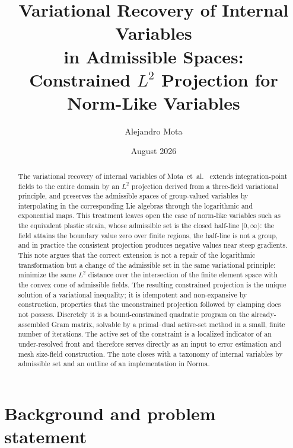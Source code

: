 \documentclass[11pt]{article}
\title{Variational Recovery of Internal Variables\\
in Admissible Spaces:\\
Constrained $L^2$ Projection for Norm-Like Variables}
\author{Alejandro Mota}
\date{August 2026}
\begin{document}
\maketitle

\begin{abstract}
The variational recovery of internal variables of
Mota~et~al.~\cite{mota2013} extends integration-point fields to the entire
domain by an $L^2$ projection derived from a three-field variational
principle, and preserves the admissible spaces of group-valued variables by
interpolating in the corresponding Lie algebras through the logarithmic and
exponential maps. This treatment leaves open the case of norm-like
variables such as the equivalent plastic strain, whose admissible set is
the closed half-line $[0,\infty)$: the field attains the boundary value
zero over finite regions, the half-line is not a group, and in practice the
consistent projection produces negative values near steep gradients. This
note argues that the correct extension is not a repair of the logarithmic
transformation but a change of the admissible set in the same variational
principle: minimize the same $L^2$ distance over the intersection of the
finite element space with the convex cone of admissible fields. The
resulting constrained projection is the unique solution of a variational
inequality; it is idempotent and non-expansive by construction, properties
that the unconstrained projection followed by clamping does not possess.
Discretely it is a bound-constrained quadratic program on the
already-assembled Gram matrix, solvable by a primal--dual active-set method
in a small, finite number of iterations. The active set of the constraint
is a localized indicator of an under-resolved front and therefore serves
directly as an input to error estimation and mesh size-field
construction. The note
closes with a taxonomy of internal variables by admissible set and an
outline of an implementation in Norma.
\end{abstract}

\tableofcontents

\section{Background and problem statement}
\label{sec:background}
\end{document}
